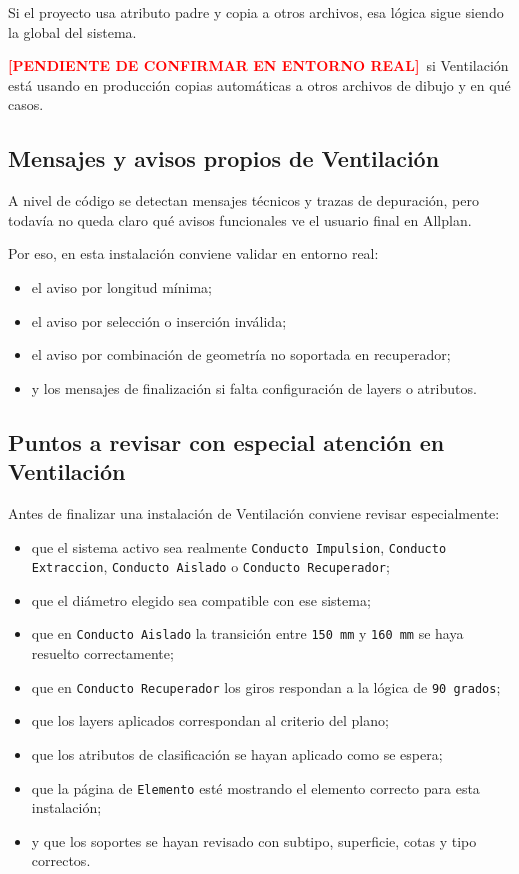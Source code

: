 \documentclass[12pt,a4paper]{article}
\newcommand{\pendingtag}{\textcolor{red}{\textbf{[PENDIENTE DE CONFIRMAR EN ENTORNO REAL]}}}
\begin{document}
Si el proyecto usa atributo padre y copia a otros archivos, esa lógica sigue siendo la global del sistema.

\pendingtag\ si Ventilación está usando en producción copias automáticas a otros archivos de dibujo y en qué casos.

\subsection{Mensajes y avisos propios de Ventilación}

A nivel de código se detectan mensajes técnicos y trazas de depuración, pero todavía no queda claro qué avisos funcionales ve el usuario final en Allplan.

Por eso, en esta instalación conviene validar en entorno real:

\begin{itemize}
\item el aviso por longitud mínima;
\item el aviso por selección o inserción inválida;
\item el aviso por combinación de geometría no soportada en recuperador;
\item y los mensajes de finalización si falta configuración de layers o atributos.
\end{itemize}

\subsection{Puntos a revisar con especial atención en Ventilación}

Antes de finalizar una instalación de Ventilación conviene revisar especialmente:

\begin{itemize}
\item que el sistema activo sea realmente \texttt{Conducto Impulsion}, \texttt{Conducto Extraccion}, \texttt{Conducto Aislado} o \texttt{Conducto Recuperador};
\item que el diámetro elegido sea compatible con ese sistema;
\item que en \texttt{Conducto Aislado} la transición entre \texttt{150 mm} y \texttt{160 mm} se haya resuelto correctamente;
\item que en \texttt{Conducto Recuperador} los giros respondan a la lógica de \texttt{90 grados};
\item que los layers aplicados correspondan al criterio del plano;
\item que los atributos de clasificación se hayan aplicado como se espera;
\item que la página de \texttt{Elemento} esté mostrando el elemento correcto para esta instalación;
\item y que los soportes se hayan revisado con subtipo, superficie, cotas y tipo correctos.
\end{itemize}
\end{document}
